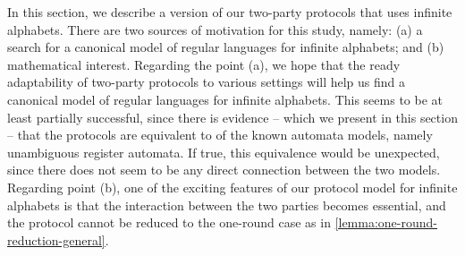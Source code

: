 In this section, we describe a version of our two-party protocols that uses infinite alphabets. There are two sources of motivation for this study, namely: (a) a search for a canonical model of regular languages for infinite alphabets; and (b) mathematical interest. Regarding the point (a), we hope that the ready adaptability of two-party protocols to various settings will help us  find a canonical model of regular languages for infinite alphabets. This seems to be at least partially successful, since there is evidence -- which we present in this section -- that the protocols are equivalent to of the known automata models, namely unambiguous register automata. If true, this equivalence would be unexpected, since  there does not seem to be any direct connection between the two models. Regarding point (b), one of the exciting features of our protocol model for infinite alphabets is that the interaction between the two parties becomes essential, and the protocol cannot be reduced to the one-round case as in \cref{lemma:one-round-reduction-general}.

